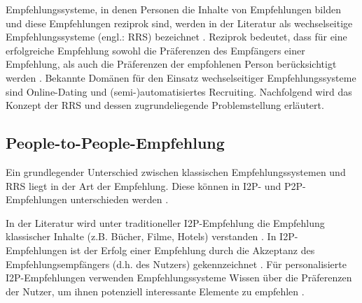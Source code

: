 Empfehlungssysteme, in denen Personen die Inhalte von Empfehlungen bilden und diese Empfehlungen reziprok sind, werden in der Literatur als wechselseitige Empfehlungssysteme (engl.: \ac{RRS}) bezeichnet \cite[S. 35]{li:inproceedings}\cite[S. 2199]{akehurst:inproceedings}\cite[S. 207]{pizzato:2010}.
Reziprok bedeutet, dass für eine erfolgreiche Empfehlung sowohl die Präferenzen des Empfängers einer Empfehlung, als auch die Präferenzen der empfohlenen Person berücksichtigt werden \cite[S. 447]{pizzato:2013}\cite[S. 22]{kleinerman:inproceedings}.
Bekannte Domänen für den Einsatz wechselseitiger Empfehlungssysteme sind Online-Dating und (semi-)automatisiertes Recruiting.
Nachfolgend wird das Konzept der RRS und dessen zugrundeliegende Problemstellung erläutert.

\subsection{People-to-People-Empfehlung}%
\label{ch:empfehlungssysteme:rrs:people_to_people}
Ein grundlegender Unterschied zwischen klassischen Empfehlungssystemen und RRS liegt in der Art der Empfehlung.
Diese können in \ac{I2P}- und \ac{P2P}-Empfehlungen unterschieden werden \cite[S. 62f.]{kim:inproceedings}.

In der Literatur wird unter traditioneller I2P-Empfehlung die Empfehlung klassischer Inhalte (z.B. Bücher, Filme, Hotels) verstanden \cite[S. 2199]{akehurst:inproceedings}\cite[S. 2429]{palomares:inproceedings}.
In I2P-Empfehlungen ist der Erfolg einer Empfehlung durch die Akzeptanz des Empfehlungsempfängers (d.h. des Nutzers) gekennzeichnet \cite[S. 131]{kleinerman:2:inproceedings}\cite[S. 546]{koprinska:inbook}.
Für personalisierte I2P-Empfehlungen verwenden Empfehlungssysteme Wissen über die Präferenzen der Nutzer, um ihnen potenziell interessante Elemente zu empfehlen \cite[S. 403]{terveen:article}.


